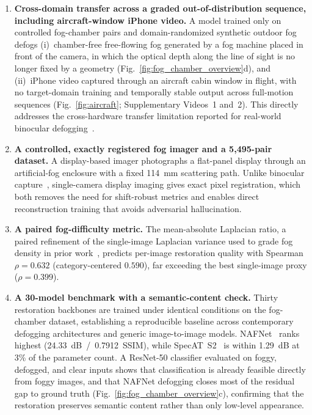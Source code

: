 \documentclass{optica-article}
\begin{document}
\begin{enumerate}

\item \textbf{Cross-domain transfer across a graded out-of-distribution
sequence, including aircraft-window iPhone video.} A model trained
only on controlled fog-chamber pairs and domain-randomized
synthetic outdoor fog defogs (i)~chamber-free free-flowing fog
generated by a fog machine placed in front of the camera, in
which the optical depth along the line of sight is no longer fixed
by a geometry (Fig.~\ref{fig:fog_chamber_overview}d), and (ii)~iPhone
video captured through an aircraft cabin window in flight, with
no target-domain training and temporally stable output across
full-motion sequences (Fig.~\ref{fig:aircraft}; Supplementary
Videos~1 and~2). This directly addresses the cross-hardware
transfer limitation reported for real-world binocular
defogging~\cite{pollak2024stereofog}.

\item \textbf{A controlled, exactly registered fog imager and a
5{,}495-pair dataset.} A display-based imager photographs a flat-panel display through an artificial-fog enclosure
with a fixed 114~mm scattering path. Unlike binocular
capture~\cite{pollak2024stereofog}, single-camera display imaging
gives exact pixel registration, which both removes the need for
shift-robust metrics and enables direct reconstruction training
that avoids adversarial hallucination.

\item \textbf{A paired fog-difficulty metric.} The mean-absolute
Laplacian ratio, a paired refinement of the single-image Laplacian
variance used to grade fog density in prior
work~\cite{pollak2024stereofog}, predicts per-image restoration
quality with Spearman $\rho = 0.632$ (category-centered $0.590$),
far exceeding the best single-image proxy ($\rho = 0.399$).

\item \textbf{A 30-model benchmark with a semantic-content check.}
Thirty restoration backbones are trained under identical conditions
on the fog-chamber dataset, establishing a reproducible baseline
across contemporary defogging architectures and generic
image-to-image models. NAFNet~\cite{chen2022simple} ranks highest
(24.33~dB~/~0.7912~SSIM), while SpecAT~S2~\cite{yao2024specat} is
within 1.29~dB at 3\% of the parameter count. A ResNet-50
classifier evaluated on foggy, defogged, and clear inputs shows
that classification is already feasible directly from foggy
images, and that NAFNet defogging closes most of the residual gap
to ground truth (Fig.~\ref{fig:fog_chamber_overview}c), confirming
that the restoration preserves semantic content rather than only
low-level appearance.


\end{enumerate}
\end{document}
